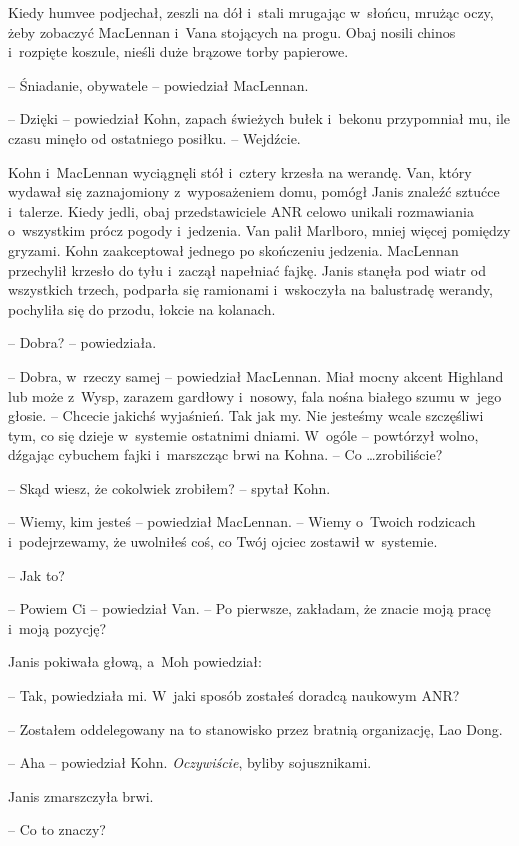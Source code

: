 \documentclass[oneside,polish,11pt,sfheadings]{mwbk}
\begin{document}
Kiedy humvee podjechał, zeszli na dół i~stali mrugając w~słońcu, mrużąc
oczy, żeby zobaczyć MacLennan i~Vana stojących na progu. Obaj nosili
chinos i~rozpięte koszule, nieśli duże brązowe torby papierowe.

-- Śniadanie, obywatele -- powiedział MacLennan.

-- Dzięki -- powiedział Kohn, zapach świeżych bułek i~bekonu przypomniał
mu, ile czasu minęło od ostatniego posiłku. -- Wejdźcie.

Kohn i~MacLennan wyciągnęli stół i~cztery krzesła na werandę. Van, który
wydawał się zaznajomiony z~wyposażeniem domu, pomógł Janis znaleźć
sztućce i~talerze. Kiedy jedli, obaj przedstawiciele ANR celowo unikali
rozmawiania o~wszystkim prócz pogody i~jedzenia. Van palił Marlboro,
mniej więcej pomiędzy gryzami. Kohn zaakceptował jednego po skończeniu
jedzenia. MacLennan przechylił krzesło do tyłu i~zaczął napełniać fajkę.
Janis stanęła pod wiatr od wszystkich trzech, podparła się ramionami i~wskoczyła na balustradę werandy, pochyliła się do przodu, łokcie na
kolanach.

-- Dobra? -- powiedziała.

-- Dobra, w~rzeczy samej -- powiedział MacLennan. Miał mocny akcent
Highland lub może z~Wysp, zarazem gardłowy i~nosowy, fala nośna białego
szumu w~jego głosie. -- Chcecie jakichś wyjaśnień. Tak jak my. Nie
jesteśmy wcale szczęśliwi tym, co się dzieje w~systemie ostatnimi
dniami. W~ogóle -- powtórzył wolno, dźgając cybuchem fajki i~marszcząc
brwi na Kohna. -- Co \ldots zrobiliście?

-- Skąd wiesz, że cokolwiek zrobiłem? -- spytał Kohn.

-- Wiemy, kim jesteś -- powiedział MacLennan. -- Wiemy o~Twoich rodzicach i~podejrzewamy, że uwolniłeś coś, co Twój ojciec zostawił w~systemie.

-- Jak to?

-- Powiem Ci -- powiedział Van. -- Po pierwsze, zakładam, że znacie moją
pracę i~moją pozycję?

Janis pokiwała głową, a~Moh powiedział: 

-- Tak, powiedziała mi. W~jaki
sposób zostałeś doradcą naukowym ANR?

-- Zostałem oddelegowany na to stanowisko przez bratnią organizację, Lao
Dong.

-- Aha -- powiedział Kohn. \emph{Oczywiście}, byliby sojusznikami.

Janis zmarszczyła brwi. 

-- Co to znaczy?
\end{document}

